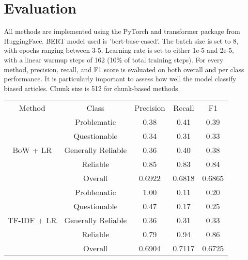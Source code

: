 \chapter{Evaluation}
\label{cha:6}

All methods are implemented using the PyTorch \cite{paszke-2017-pytorch} and transformer \cite{wolf-2020-huggingface} package from HuggingFace. BERT model used is 'bert-base-cased'. The batch size is set to 8, with epochs ranging between 3-5. Learning rate is set to either 1e-5 and 2e-5, with a linear warmup steps of 162 (10\% of total training steps). For every method, precision, recall, and F1 score is evaluated on both overall and per class performance. It is particularly important to assess how well the model classify biased articles. Chunk size is 512 for chunk-based methods.

\begin{table}[htbp]
    \centering
    \small
    \begin{tabular}{| c | c | c | c | c |}
        \hline                            Method & Class              & Precision & Recall & F1     \\\cline{1-5}
        \multirow{5}{*}{BoW + LR}                & Problematic        & 0.38      & 0.41   & 0.39   \\
                                                 & Questionable       & 0.34      & 0.31   & 0.33   \\
                                                 & Generally Reliable & 0.36      & 0.40   & 0.38   \\
                                                 & Reliable           & 0.85      & 0.83   & 0.84   \\
                                                 & Overall            & 0.6922    & 0.6818 & 0.6865 \\
        \hline
        \multirow{5}{*}{TF-IDF + LR}             & Problematic        & 1.00      & 0.11   & 0.20   \\
                                                 & Questionable       & 0.47      & 0.17   & 0.25   \\
                                                 & Generally Reliable & 0.36      & 0.31   & 0.33   \\
                                                 & Reliable           & 0.79      & 0.94   & 0.86   \\
                                                 & Overall            & 0.6904    & 0.7117 & 0.6725 \\

\end{tabular}
\end{table}
